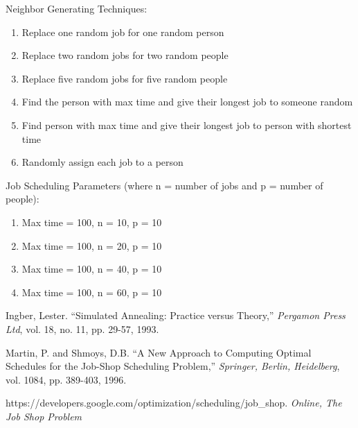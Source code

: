 \documentclass[11pt]{article}
\begin{document}
Neighbor Generating Techniques:
\begin{enumerate}
\item Replace one random job for one random person
\item Replace two random jobs for two random people
\item Replace five random jobs for five random people
\item Find the person with max time and give their longest job to someone random
\item Find person with max time and give their longest job to person with shortest time
\item Randomly assign each job to a person
\end{enumerate}

Job Scheduling Parameters (where n = number of jobs and p = number of people):
\begin{enumerate}
\item Max time = 100, n = 10, p = 10
\item Max time = 100, n = 20, p = 10
\item Max time = 100, n = 40, p = 10
\item Max time = 100, n = 60, p = 10
\end{enumerate}

\begin{thebibliography}{10}

 Ingber, Lester. ``Simulated Annealing: Practice versus Theory,'' {\em  Pergamon Press Ltd}, vol. 18, no. 11, pp. 29-57, 1993.

 Martin, P. and Shmoys, D.B. ``A New Approach to Computing Optimal Schedules for the Job-Shop Scheduling Problem,'' {\em Springer, Berlin, Heidelberg}, vol. 1084, pp. 389-403, 1996.

 https://developers.google.com/optimization/scheduling/job\_shop. {\em Online, The Job Shop Problem}

\end{thebibliography}
\end{document}
